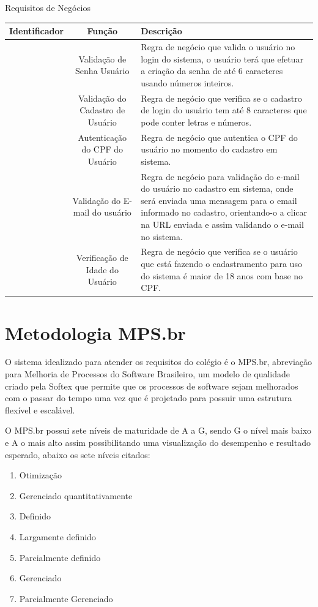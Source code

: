 \documentclass[
	12pt,				%
	openright,			%
	twoside,			%
	a4paper,			%
	english,			%
	french,				%
	spanish,			%
	brazil				%
	]{abntex2}
\begin{document}
\begin{quadro}[htb]
	\centering
	\caption{\label{quadro_RN}Requisitos de Negócios}
	\begin{tabular}{|c|c|>{\centering\arraybackslash}p{6cm}|}
		\hline
		\textbf{Identificador} & \textbf{Função} & \textbf{Descrição}\\ \hline
		[RN01] & Validação de Senha Usuário & Regra de negócio que valida
		o usuário no login do
		sistema, o usuário terá que
		efetuar a criação da senha
		de até 6 caracteres usando
		números inteiros. \\ \hline
		[RN02] & Validação do Cadastro de Usuário & Regra de negócio que
		verifica se o cadastro de
		login do usuário tem até
		8 caracteres que pode
		conter letras e números. \\ \hline
		[RN03] & Autenticação do CPF do Usuário & Regra de negócio que
		autentica o CPF do usuário
		no momento do cadastro em
		sistema. \\ \hline
		[RN04] & Validação do E-mail do usuário & Regra de negócio para
		validação do e-mail do
		usuário no cadastro em
		sistema, onde será enviada
		uma mensagem para o email informado no
		cadastro, orientando-o a
		clicar na URL enviada e
		assim validando o e-mail no
		sistema. \\ \hline
		[RN05] & Verificação de Idade do Usuário & Regra de negócio que
		verifica se o usuário que
		está fazendo o
		cadastramento
		para uso do sistema é maior
		de 18 anos com base no
		CPF. \\ \hline
	\end{tabular}
\end{quadro}

\section{Metodologia MPS.br}
O sistema idealizado para atender os requisitos do colégio é o MPS.br,
abreviação para Melhoria de Processos do Software Brasileiro, um modelo de
qualidade criado pela Softex que permite que os processos de software sejam
melhorados com o passar do tempo uma vez que é projetado para possuir uma
estrutura flexível e escalável.

O MPS.br possui sete níveis de maturidade de A a G, sendo G o nível mais
baixo e A o mais alto assim possibilitando uma visualização do desempenho e
resultado esperado, abaixo os sete níveis citados:

\begin{enumerate}[label=\textbf{(\Alph*)}]
	\item Otimização
	\item Gerenciado quantitativamente
	\item Definido
	\item Largamente definido
	\item Parcialmente definido
	\item Gerenciado
	\item Parcialmente Gerenciado
\end{enumerate}
\end{document}
